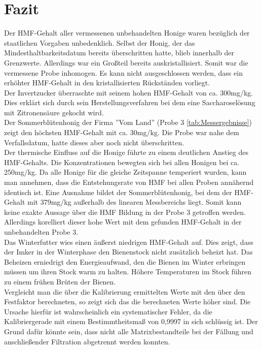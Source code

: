 \chapter{Fazit}
Der HMF-Gehalt aller vermessenen unbehandelten Honige waren bezüglich der staatlichen Vorgaben unbedenklich. Selbst der Honig, der das Mindesthaltbarkeitsdatum bereits überschritten hatte, blieb innerhalb der Grenzwerte. Allerdings war ein Großteil bereits auskristallisiert. Somit war die vermessene Probe inhomogen. Es kann nicht ausgeschlossen werden, dass ein erhöhter HMF-Gehalt in den kristallisierten Rückständen vorliegt.\\
Der Invertzucker überraschte mit seinem hohen HMF-Gehalt von ca. 300mg/kg. Dies erklärt sich durch sein Herstellungsverfahren bei dem eine Saccharoselösung mit Zitronensäure gekocht wird.\\
Der Sommerblütenhonig der Firma ''Vom Land'' (Probe 3 \ref{tab:Messergebnisse}) zeigt den höchsten HMF-Gehalt mit ca. 30mg/kg. Die Probe war nahe dem Verfallsdatum, hatte dieses aber noch nicht überschritten.\\
Der thermische Einfluss auf die Honige führte zu einem deutlichen Anstieg des HMF-Gehalts. Die Konzentrationen bewegten sich bei allen Honigen bei ca. 250mg/kg. Da alle Honige für die gleiche Zeitspanne temperiert wurden, kann man annehmen, dass die Entstehungsrate von HMF bei allen Proben annähernd identisch ist. Eine Ausnahme bildet der Sommerblütenhonig, bei dem der HMF-Gehalt mit 379mg/kg außerhalb des linearen Messbereichs liegt. Somit kann keine exakte Aussage über die HMF Bildung in der Probe 3 getroffen werden. Allerdings korelliert dieser hohe Wert mit dem gefunden HMF-Gehalt in der unbehandelten Probe 3.\\
Das Winterfutter wies einen äußerst niedrigen HMF-Gehalt auf. Dies zeigt, dass der Imker in der Winterphase den Bienenstock nicht zusätzlich beheizt hat. Das Beheizen erniedrigt den Energieaufwand, den die Bienen im Winter erbringen müssen um ihren Stock warm zu halten. Höhere Temperaturen im Stock führen zu einem frühen Brüten der Bienen.\\
Vergleicht man die über die Kalibrierung ermittelten Werte mit den über den Festfaktor berechneten, so zeigt sich das die berechneten Werte höher sind. Die Ursache hierfür ist wahrscheinlich ein systematischer Fehler, da die Kalibriergerade mit einem Bestimmtheitsmaß von 0,9997 in sich schlüssig ist. Der Grund dafür könnte sein, dass nicht alle Matrixbestandteile bei der Fällung und anschließender Filtration abgetrennt werden konnten.\\

